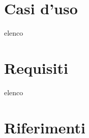 \documentclass[a4paper, 12pt]{article}
\begin{document}
\section{Casi d'uso}
elenco

\section{Requisiti}
elenco

\section{Riferimenti}
\end{document}
